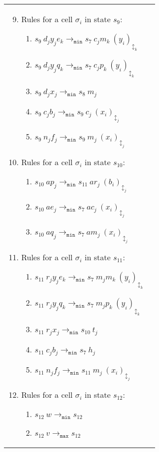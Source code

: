 \documentclass[preliminary,copyright,creativecommons]{eptcs}
\theoremstyle{remark}
\newcommand{\modmin}{\mathtt{min}}
\newcommand{\modmax}{\mathtt{max}}
\begin{document}
\begin{tabular}[t]{ll}
\begin{minipage}[t]{3.0in}
\begin{enumerate}
  \setcounter{enumi}{8}
  \item Rules for a cell $\sigma_i$ in state $s_9$:
    \begin{enumerate}[1]
    
    \item $s_9~ d_j y_j e_k \rightarrow_{\modmin} s_7~ c_j m_k~ (y_i)_{\updownarrow_k}$
    \item $s_9~ d_j y_j q_k \rightarrow_{\modmin} s_7~ c_j p_k~ (y_i)_{\updownarrow_k}$

    \item $s_9~ d_j x_j \rightarrow_{\modmin} s_8~ m_j$

    \item $s_9~ c_j b_j \rightarrow_{\modmin} s_9~ c_j~ (x_i)_{\updownarrow_j}$
    \item $s_9~ n_j f_j \rightarrow_{\modmin} s_9~ m_j~ (x_i)_{\updownarrow_j}$ 
    \end{enumerate} 
  
  \item Rules for a cell $\sigma_i$ in state $s_{10}$:
    \begin{enumerate}[1]
    \item $s_{10}~ a p_j \rightarrow_{\modmin} s_{11}~ a r_j~ (b_i)_{\updownarrow_{j}}$ 

    \item $s_{10}~ a e_j \rightarrow_{\modmin} s_7~ a c_j~ (x_i)_{\updownarrow_{j}}$ 
    \item $s_{10}~ a q_j \rightarrow_{\modmin} s_7~ a m_j~ (x_i)_{\updownarrow_{j}}$ 
    \end{enumerate}

  \item Rules for a cell $\sigma_i$ in state $s_{11}$:
    \begin{enumerate}[1]
    \item $s_{11}~ r_j y_j e_k \rightarrow_{\modmin} s_7~ m_j m_k~ (y_i)_{\updownarrow_k}$
    \item $s_{11}~ r_j y_j q_k \rightarrow_{\modmin} s_7~ m_j p_k~ (y_i)_{\updownarrow_k}$
    \item $s_{11}~ r_j x_j \rightarrow_{\modmin} s_{10}~ t_j$

    \item $s_{11}~ c_j b_j \rightarrow_{\modmin} s_7~ h_j$
    \item $s_{11}~ n_j f_j \rightarrow_{\modmin} s_{11}~ m_j~ (x_i)_{\updownarrow_j}$ 
    \end{enumerate}

  \item Rules for a cell $\sigma_i$ in state $s_{12}$:
    \begin{enumerate}[1]
    \item $s_{12}~ w \rightarrow_{\modmin} s_{12}$
    \item $s_{12}~ v \rightarrow_{\modmax} s_{12}$


\end{enumerate}
\end{enumerate}
\end{minipage}
\end{tabular}
\end{document}
